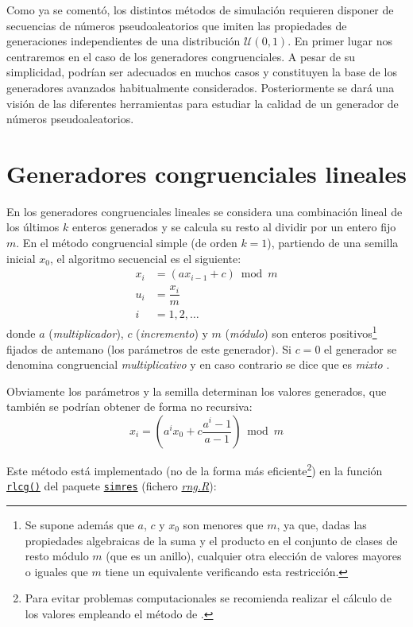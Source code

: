 \documentclass[
  10pt,
]{book}
\theoremstyle{break}
\theoremstyle{nonumberplain}
\let\oldfootnote\footnote
\renewcommand\footnote[1]{\oldfootnote{\hspace{2mm}#1}}
\begin{document}
Como ya se comentó, los distintos métodos de simulación requieren disponer de secuencias de números pseudoaleatorios que imiten las propiedades de generaciones independientes de una distribución \(\mathcal{U}(0,1)\).
En primer lugar nos centraremos en el caso de los generadores congruenciales. A pesar de su simplicidad, podrían ser adecuados en muchos casos y constituyen la base de los generadores avanzados habitualmente considerados.
Posteriormente se dará una visión de las diferentes herramientas para estudiar la calidad de un generador de números pseudoaleatorios.

\hypertarget{gen-cong}{%
\section{Generadores congruenciales lineales}\label{gen-cong}}

En los generadores congruenciales lineales se considera una combinación lineal de los últimos \(k\) enteros generados y se calcula su resto al dividir por un entero fijo \(m\).
En el método congruencial simple (de orden \(k = 1\)), partiendo de una semilla inicial \(x_0\), el algoritmo secuencial es el siguiente:
\[\begin{aligned}
x_{i}  & = (ax_{i-1}+c) \bmod m \\
u_{i}  & = \dfrac{x_{i}}{m} \\
i  & =1,2,\ldots
\end{aligned}\]
donde \(a\) (\emph{multiplicador}), \(c\) (\emph{incremento}) y \(m\) (\emph{módulo}) son enteros positivos\footnote{Se supone además que \(a\), \(c\) y \(x_0\) son menores que \(m\), ya que, dadas las propiedades algebraicas de la suma y el producto en el conjunto de clases de resto módulo \(m\) (que es un anillo), cualquier otra elección de valores mayores o iguales que \(m\) tiene un equivalente verificando esta restricción.} fijados de antemano (los parámetros de este generador). Si \(c=0\) el generador se denomina congruencial \emph{multiplicativo} \citep{lehmer1951} y en caso contrario se dice que es \emph{mixto} \citep{rotenberg1960}.

Obviamente los parámetros y la semilla determinan los valores generados, que también se podrían obtener de forma no recursiva:
\[x_{i}=\left( a^{i}x_0+c\frac{a^{i}-1}{a-1}\right) \bmod m\]

Este método está implementado (no de la forma más eficiente\footnote{Para evitar problemas computacionales se recomienda realizar el cálculo de los valores empleando el método de \citeauthor{schrage1979} \citetext{\citeyear{schrage1979}; \citealp[ver e.g.][sec.~6.5.2]{bratley1983}}.}) en la función \href{https://rubenfcasal.github.io/simres/reference/set.rng.html}{\texttt{rlcg()}} del paquete \href{https://rubenfcasal.github.io/simres}{\texttt{simres}} (fichero \href{R/rng.R}{\emph{rng.R}}):
\end{document}

